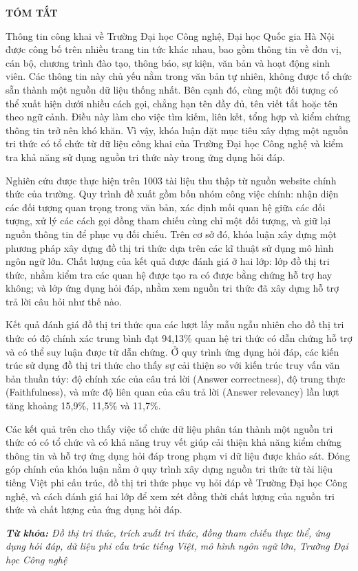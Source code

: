 \thispagestyle{empty}
\begin{center}
\fontsize{13pt}{1pt}\selectfont
    \textbf{TÓM TẮT}
\end{center}

\fontsize{13pt}{1pt}\selectfont
\vspace{1cm}

Thông tin công khai về Trường Đại học Công nghệ, Đại học Quốc gia Hà Nội được công bố trên nhiều trang tin tức khác nhau, bao gồm thông tin về đơn vị, cán bộ, chương trình đào tạo, thông báo, sự kiện, văn bản và hoạt động sinh viên. Các thông tin này chủ yếu nằm trong văn bản tự nhiên, không được tổ chức sẵn thành một nguồn dữ liệu thống nhất. Bên cạnh đó, cùng một đối tượng có thể xuất hiện dưới nhiều cách gọi, chẳng hạn tên đầy đủ, tên viết tắt hoặc tên theo ngữ cảnh. Điều này làm cho việc tìm kiếm, liên kết, tổng hợp và kiểm chứng thông tin trở nên khó khăn. Vì vậy, khóa luận đặt mục tiêu xây dựng một nguồn tri thức có tổ chức từ dữ liệu công khai của Trường Đại học Công nghệ và kiểm tra khả năng sử dụng nguồn tri thức này trong ứng dụng hỏi đáp.

Nghiên cứu được thực hiện trên 1003 tài liệu thu thập từ nguồn website chính thức của trường. Quy trình đề xuất gồm bốn nhóm công việc chính: nhận diện các đối tượng quan trọng trong văn bản, xác định mối quan hệ giữa các đối tượng, xử lý các cách gọi đồng tham chiếu cùng chỉ một đối tượng, và giữ lại nguồn thông tin để phục vụ đối chiếu. Trên cơ sở đó, khóa luận xây dựng một phương pháp xây dựng đồ thị tri thức dựa trên các kĩ thuật sử dụng mô hình ngôn ngữ lớn. Chất lượng của kết quả được đánh giá ở hai lớp: lớp đồ thị tri thức, nhằm kiểm tra các quan hệ được tạo ra có được bằng chứng hỗ trợ hay không; và lớp ứng dụng hỏi đáp, nhằm xem nguồn tri thức đã xây dựng hỗ trợ trả lời câu hỏi như thế nào.

Kết quả đánh giá đồ thị tri thức qua các lượt lấy mẫu ngẫu nhiên cho đồ thị tri thức có độ chính xác trung bình đạt 94,13\% quan hệ tri thức có dẫn chứng hỗ trợ và có thể suy luận được từ dẫn chứng. Ở quy trình ứng dụng hỏi đáp, các kiến trúc sử dụng đồ thị tri thức cho thấy sự cải thiện so với kiến trúc truy vấn văn bản thuần túy: độ chính xác của câu trả lời (Answer correctness), độ trung thực (Faithfulness), và mức độ liên quan của câu trả lời (Answer relevancy) lần lượt tăng khoảng 15,9\%, 11,5\% và 11,7\%.

Các kết quả trên cho thấy việc tổ chức dữ liệu phân tán thành một nguồn tri thức có có tổ chức và có khả năng truy vết giúp cải thiện khả năng kiểm chứng thông tin và hỗ trợ ứng dụng hỏi đáp trong phạm vi dữ liệu được khảo sát. Đóng góp chính của khóa luận nằm ở quy trình xây dựng nguồn tri thức từ tài liệu tiếng Việt phi cấu trúc, đồ thị tri thức phục vụ hỏi đáp về Trường Đại học Công nghệ, và cách đánh giá hai lớp để xem xét đồng thời chất lượng của nguồn tri thức và chất lượng của ứng dụng hỏi đáp.

\vspace{0.5cm}

\textit{\textbf{Từ khóa:} Đồ thị tri thức, trích xuất tri thức, đồng tham chiếu thực thể, ứng dụng hỏi đáp, dữ liệu phi cấu trúc tiếng Việt, mô hình ngôn ngữ lớn, Trường Đại học Công nghệ}
